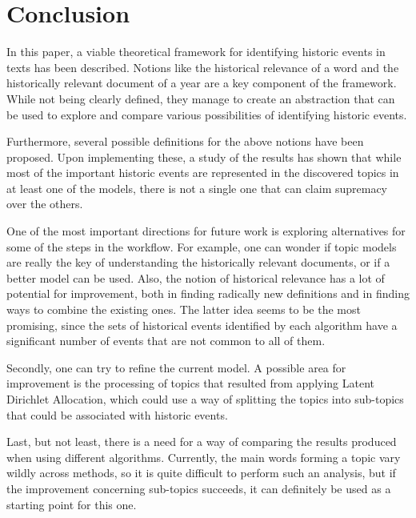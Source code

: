 \chapter{Conclusion}
\label{chapter:conclusion}

In this paper, a viable theoretical framework for identifying historic events in texts has been described. Notions like the historical relevance of a word and the historically relevant document of a year are a key component of the framework. While not being clearly defined, they manage to create an abstraction that can be used to explore and compare various possibilities of identifying historic events.

Furthermore, several possible definitions for the above notions have been proposed. Upon implementing these, a study of the results has shown that while most of the important historic events are represented in the discovered topics in at least one of the models, there is not a single one that can claim supremacy over the others.

One of the most important directions for future work is exploring alternatives for some of the steps in the workflow. For example, one can wonder if topic models are really the key of understanding the historically relevant documents, or if a better model can be used. Also, the notion of historical relevance has a lot of potential for improvement, both in finding radically new definitions and in finding ways to combine the existing ones. The latter idea seems to be the most promising, since the sets of historical events identified by each algorithm have a significant number of events that are not common to all of them.

Secondly, one can try to refine the current model. A possible area for improvement is the processing of topics that resulted from applying Latent Dirichlet Allocation, which could use a way of splitting the topics into sub-topics that could be associated with historic events.

Last, but not least, there is a need for a way of comparing the results produced when using different algorithms. Currently, the main words forming a topic vary wildly across methods, so it is quite difficult to perform such an analysis, but if the improvement concerning sub-topics succeeds, it can definitely be used as a starting point for this one.
